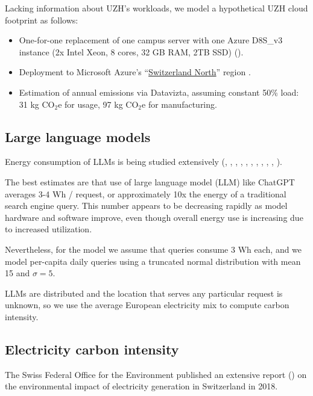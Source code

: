 \documentclass[11pt]{article}
\begin{document}
Lacking information about UZH's workloads, we model a hypothetical UZH cloud footprint as follows:
\begin{itemize}
    \item One-for-one replacement of one campus server with one Azure D8S\_v3 instance (2x Intel
      Xeon, 8 cores, 32 GB RAM, 2TB SSD) (\cite{msftvms}).
    \item Deployment to Microsoft Azure's ``\href{https://datacenters.microsoft.com/globe/explore?info=region_switzerlandnorth}{Switzerland North}'' region .
    \item Estimation of annual emissions via Datavizta, assuming constant 50\% load: 31 kg CO$_2$e for usage,
      97 kg CO$_2$e for manufacturing.
\end{itemize}

\subsection{Large language models}

Energy consumption of LLMs is being studied extensively (\textcite{budennyy2022eco2ai},
\textcite{castano2023exploring},
\textcite{devries2023growing},
\textcite{gowda2024watt},
\textcite{harding2024watts}, 
\textcite{heguerte2023estimate},
\textcite{luccioni2022estimating},
\textcite{luccioni2023counting},
\textcite{patterson2021carbon}, 
\textcite{rodriguez2024evaluating},
\textcite{tripp2024measuring}). 

The best estimates are that use of large language model (LLM) like ChatGPT averages 3-4 Wh / request,
or approximately 10x the energy of a traditional search engine query. This number appears to be decreasing
rapidly as model hardware and software improve, even though overall energy use is increasing due to
increased utilization.

Nevertheless, for the model we assume that queries consume 3 Wh each, and we model per-capita daily
queries using a truncated normal distribution with mean 15 and $\sigma = 5$.

LLMs are distributed and the location that serves any particular request is unknown, so we use the 
average European electricity mix to compute carbon intensity.

\subsection{Electricity carbon intensity}

The Swiss Federal Office for the Environment published an extensive report (\textcite{krebs2018umweltbilanz})
on the environmental impact of electricity generation in Switzerland in 2018.
\end{document}
